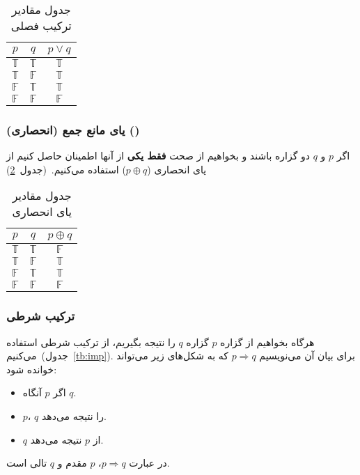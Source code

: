 \documentclass[a5paper]{article}
\newcommand{\T}{\mathbb{T}}
\newcommand{\F}{\mathbb{F}}
\newcommand{\reft}[1]{~(جدول~\ref{tb:#1})}
\begin{document}
\begin{table}[ht]\centering
  \begin{LTR}
    \begin{tabular}{c c|c}
      $p$ & $q$ & $p \lor q$ \\
      \hline
      $\T$ & $\T$ & $\T$ \\
      $\T$ & $\F$ & $\T$ \\
      $\F$ & $\T$ & $\T$ \\
      $\F$ & $\F$ & $\F$ \\
    \end{tabular}
  \end{LTR}
  \caption{جدول مقادیر ترکیب فصلی}\label{tb:or}
\end{table}

\subsubsection{یای مانع جمع (انحصاری) ()}
اگر $p$ و $q$ دو گزاره باشند و بخواهیم از صحت \textbf{فقط یکی} از آنها اطمینان حاصل کنیم از یای انحصاری ($p \oplus q$) استفاده می‌کنیم.\reft{xor}

\begin{table}[ht]\centering
  \begin{LTR}
    \begin{tabular}{c c|c}
      $p$ & $q$ & $p \oplus q$ \\
      \hline
      $\T$ & $\T$ & $\F$ \\
      $\T$ & $\F$ & $\T$ \\
      $\F$ & $\T$ & $\T$ \\
      $\F$ & $\F$ & $\F$ \\
    \end{tabular}
  \end{LTR}
  \caption{جدول مقادیر یای انحصاری}\label{tb:xor}
\end{table}

\subsubsection{ترکیب شرطی}
هرگاه بخواهیم از گزاره $p$ گزاره $q$ را نتیجه بگیریم، از ترکیب شرطی استفاده می‌کنیم\reft{imp}. برای بیان آن می‌نویسیم $p \Rightarrow q$ که به شکل‌های زیر می‌تواند خوانده شود:
\begin{itemize}
  \item اگر $p$ آنگاه $q$.
  \item $p$، $q$ را نتیجه می‌دهد.
  \item $q$ از $p$ نتیجه می‌دهد.
\end{itemize}
در عبارت $p \Rightarrow q$، $p$ مقدم و $q$ تالی است.
\end{document}
